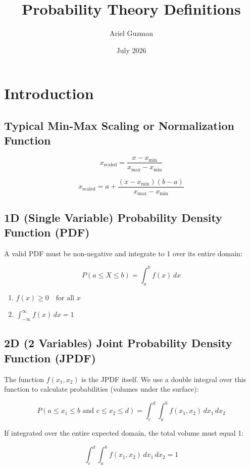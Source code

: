 \documentclass{article}
\title{Probability Theory Definitions}
\author{Ariel Guzman}
\date{July 2026}
\begin{document}
\maketitle

\section{Introduction}


\subsection*{Typical Min-Max Scaling or Normalization Function}

\[
x_{\text{scaled}} = \frac{x - x_{\min}}{x_{\max} - x_{\min}}
\]

\[
x_{\text{scaled}} = a + \frac{(x - x_{\min})(b - a)}{x_{\max} - x_{\min}}
\]

\subsection*{1D (Single Variable) Probability Density Function (PDF)}

A valid PDF must be non-negative and integrate to 1 over its entire domain:

\[
P(a \leq X \leq b) = \int_{a}^{b} f(x) \, dx
\]

\begin{enumerate}
    \item $f(x) \geq 0 \quad \text{for all } x$
    \item $\int_{-\infty}^{\infty} f(x) \, dx = 1$
\end{enumerate}

\subsection*{2D (2 Variables) Joint Probability Density Function (JPDF)}

The function $f(x_1, x_2)$ is the JPDF itself. We use a double integral over this function to calculate probabilities (volumes under the surface):

\[
P(a \leq x_1 \leq b \text{ and } c \leq x_2 \leq d) = \int_{c}^{d} \int_{a}^{b} f(x_1, x_2) \, dx_1 \, dx_2
\]

If integrated over the entire expected domain, the total volume must equal 1:

\[
\int_{c}^{d} \int_{a}^{b} f(x_1, x_2) \, dx_1 \, dx_2 = 1
\]
\end{document}
